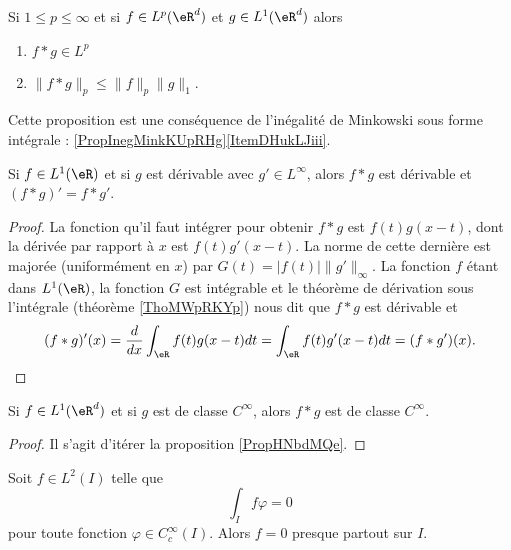 \begin{proposition}     \label{PROPooDMMCooPTuQuS}
    Si \( 1\leq p\leq \infty\) et si \( f\in L^p(\eR^d)\) et \( g\in L^1(\eR^d)\) alors
    \begin{enumerate}
        \item
            \( f*g\in L^p\)
        \item
            \( \| f*g \|_p\leq \| f \|_p\| g \|_1\).
    \end{enumerate}
\end{proposition}
Cette proposition est une conséquence de l'inégalité de Minkowski sous forme intégrale : \ref{PropInegMinkKUpRHg}\ref{ItemDHukLJiii}.

\begin{proposition} \label{PropHNbdMQe}
    Si \( f\in L^1(\eR)\) et si \( g\) est dérivable avec \( g'\in L^{\infty}\), alors \( f*g\) est dérivable et \( (f*g)'=f*g'\).
\end{proposition}

\begin{proof}
    La fonction qu'il faut intégrer pour obtenir \( f*g\) est $f(t)g(x-t)$, dont la dérivée par rapport à \( x\) est \( f(t)g'(x-t)\). La norme de cette dernière est majorée (uniformément en \( x\)) par \( G(t)=| f(t) | \| g' \|_{\infty}\). La fonction \( f\) étant dans \( L^1(\eR)\), la fonction \( G\) est intégrable et le théorème de dérivation sous l'intégrale (théorème \ref{ThoMWpRKYp}) nous dit que \( f*g\) est dérivable et
    \begin{equation}
        (f*g)'(x)=\frac{ d }{ dx }\int_{\eR}f(t)g(x-t)dt=\int_{\eR}f(t)g'(x-t)dt=(f*g')(x).
    \end{equation}
\end{proof}

\begin{corollary}       \label{CORooBSPNooFwYQrc}
    Si \( f\in L^1(\eR^d)\) et si \( g\) est de classe \(  C^{\infty}\), alors \( f*g\) est de classe \(  C^{\infty}\).
\end{corollary}

\begin{proof}
    Il s'agit d'itérer la proposition \ref{PropHNbdMQe}.
\end{proof}

\begin{lemma}       \label{LemDQEKNNf}
    Soit \( f\in L^2(I)\) telle que
    \begin{equation}
        \int_If\varphi=0
    \end{equation}
    pour toute fonction \( \varphi\in C^{\infty}_c(I)\). Alors \( f=0\) presque partout sur \( I\).
\end{lemma}

